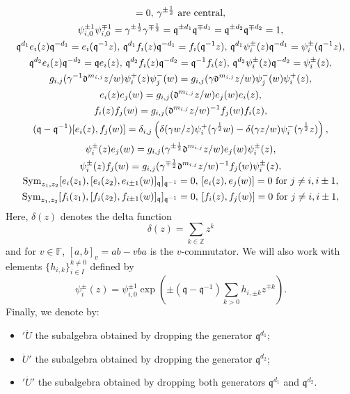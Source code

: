 \documentclass{amsart}
\newcommand{\Z}{\mathbb{Z}}
\newcommand{\F}{\mathbb{F}}
\newcommand{\qqq}{\mathfrak{q}}
\newcommand{\ddd}{\mathfrak{d}}
\theoremstyle{remark}
\numberwithin{thm}{section}
\numberwithin{equation}{section}
\begin{document}
\begin{gather*}
[\psi_i^\pm(z),\psi_j^\pm(w)]=0,\,\gamma^{\pm\frac{1}{2}}\hbox{ are central},\\
\psi_{i,0}^{\pm1}\psi_{i,0}^{\mp1}=\gamma^{\pm\frac{1}{2}}\gamma^{\mp\frac{1}{2}}=\qqq^{\pm d_1}\qqq^{\mp d_1}=\qqq^{\pm d_2}\qqq^{\mp d_2}=1,\\
\qqq^{d_1}e_i(z)\qqq^{-d_1}=e_i(\qqq^{-1} z),\, \qqq^{d_1}f_i(z)\qqq^{-d_1}=f_i(\qqq^{-1} z),\, \qqq^{d_1}\psi_i^\pm(z)\qqq^{-d_1}=\psi_i^\pm(\qqq^{-1} z),\\
\qqq^{d_2}e_i(z)\qqq^{-d_2}=\qqq e_i(z),\, \qqq^{d_2}f_i(z)\qqq^{-d_2}=\qqq^{-1} f_i(z),\, \qqq^{d_2}\psi_i^\pm(z)\qqq^{-d_2}=\psi_i^\pm( z),\\
g_{i,j}(\gamma^{-1}\ddd^{m_{i,j}}z/w)\psi_i^{+}(z)\psi_j^{-}(w)=g_{i,j}(\gamma\ddd^{m_{i,j}} z/w)\psi_j^{-}(w)\psi_i^{+}(z),\\
e_i(z)e_j(w)=g_{i,j}(\ddd^{m_{i,j}}z/w)e_j(w)e_i(z),\\
f_i(z)f_j(w)=g_{i,j}(\ddd^{m_{i,j}}z/w)^{-1}f_j(w)f_i(z),\\
(\qqq-\qqq^{-1})[e_i(z),f_j(w)]=\delta_{i,j}\left(\delta(\gamma w/z)\psi_i^+(\gamma^{\frac{1}{2}}w)-\delta(\gamma z/w)\psi_i^-(\gamma^\frac{1}{2}z)\right),\\
\psi_i^\pm(z)e_j(w)=g_{i,j}(\gamma^{\pm\frac{1}{2}}\ddd^{m_{i,j}}z/w)e_j(w)\psi_i^\pm(z),\\
\psi_i^\pm(z)f_j(w)=g_{i,j}(\gamma^{\mp\frac{1}{2}}\ddd^{m_{i,j}}z/w)^{-1}f_j(w)\psi_i^\pm(z),\\
\mathrm{Sym}_{z_1,z_2}[e_i(z_1),[e_i(z_2),e_{i\pm1}(w)]_\qqq]_{\qqq^{-1}}=0,\,[e_i(z),e_j(w)]=0\hbox{ for }j\not=i,i\pm1,\\
\mathrm{Sym}_{z_1,z_2}[f_i(z_1),[f_i(z_2),f_{i\pm1}(w)]_\qqq]_{\qqq^{-1}}=0,\,[f_i(z),f_j(w)]=0\hbox{ for }j\not=i,i\pm1,
\end{gather*}
Here, $\delta(z)$ denotes the delta function
\[\delta(z)=\sum_{k\in\Z}z^k\]
and for $v\in\F$, $[a,b]_v=ab-v ba$ is the $v$-commutator.
We will also work with elements $\{h_{i, k}\}_{i\in I}^{k\not= 0}$ defined by
\begin{equation}
\label{HeisDef}
 \psi_i^\pm(z)=\psi_{i,0}^{\pm 1}\exp\left(\pm(\qqq-\qqq^{-1})\sum_{k>0}h_{i,\pm k}z^{\mp k}\right).   
\end{equation}
Finally, we denote by:
\begin{itemize}
    \item $'\ddot{U}$ the subalgebra obtained by dropping the generator $\qqq^{d_1}$;
    \item $\ddot{U}'$ the subalgebra obtained by dropping the generator $\qqq^{d_2}$;
    \item $'\ddot{U}'$ the subalgebra obtained by dropping both generators $\qqq^{d_1}$ and $\qqq^{d_2}$.
\end{itemize}
\end{document}
